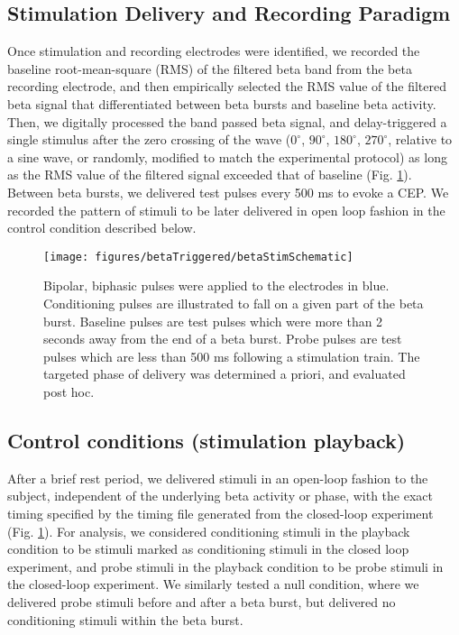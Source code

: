 \subsection{Stimulation Delivery and Recording Paradigm}
Once stimulation and recording electrodes were identified, we recorded the baseline root-mean-square (RMS) of the filtered beta band from the beta recording electrode, and then empirically selected the RMS value of the filtered beta signal that differentiated between beta bursts and baseline beta activity. Then, we digitally processed the band passed beta signal, and delay-triggered a single stimulus after the zero crossing of the wave ($0^\circ$, $90^\circ$, $180^\circ$, $270^\circ$, relative to a sine wave, or randomly, modified to match the experimental protocol) as long as the RMS value of the filtered signal exceeded that of baseline (Fig. \ref{fig:betaStimSchematic}). Between beta bursts, we delivered test pulses every 500 ms to evoke a CEP. We recorded the pattern of stimuli to be later delivered in open loop fashion in the control condition described below. 


\begin{figure}[ht]
	\centering
	\texttt{[image: figures/betaTriggered/betaStimSchematic]}
	\caption[Experimental Paradigm and Example Electrode Locations]{Bipolar, biphasic pulses were applied to the electrodes in blue. Conditioning pulses are illustrated to fall on a given part of the beta burst. Baseline pulses are test pulses which were more than 2 seconds away from the end of a beta burst. Probe pulses are test pulses which are less than 500 ms following a stimulation train. The targeted phase of delivery was determined a priori, and evaluated post hoc.}
	\label{fig:betaStimSchematic}
\end{figure}


\subsection{Control conditions (stimulation playback)}
After a brief rest period, we delivered stimuli in an open-loop fashion to the subject, independent of the underlying beta activity or phase, with the exact timing specified by the timing file generated from the closed-loop experiment (Fig. \ref{fig:betaStimSchematic}). For analysis, we considered conditioning stimuli in the playback condition to be stimuli marked as conditioning stimuli in the closed loop experiment, and probe stimuli in the playback condition to be probe stimuli in the closed-loop experiment. We similarly tested a null condition, where we delivered probe stimuli before and after a beta burst, but delivered no conditioning stimuli within the beta burst. 

